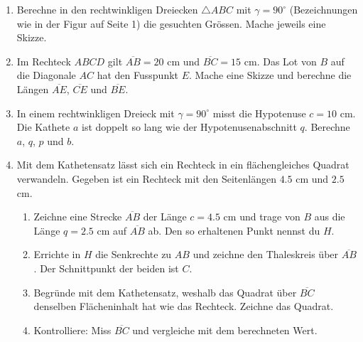 \documentclass[11pt,oneside]{article}
\begin{document}
	\begin{aufgabe}
		\begin{enumerate}
			\item Berechne in den rechtwinkligen Dreiecken $\triangle ABC$ mit $\gamma=90^\circ$ (Bezeichnungen wie in der Figur auf Seite 1) die gesuchten Grössen. Mache jeweils eine Skizze.
			\item Im Rechteck $ABCD$ gilt $\overline{AB}=20$ cm und $\overline{BC}=15$ cm. Das Lot von $B$ auf die Diagonale $AC$ hat den Fusspunkt $E$. Mache eine Skizze und berechne die Längen $\overline{AE}$, $\overline{CE}$ und $\overline{BE}$.
			\item In einem rechtwinkligen Dreieck mit $\gamma=90^\circ$ misst die Hypotenuse $c=10$ cm. Die Kathete $a$ ist doppelt so lang wie der Hypotenusenabschnitt $q$. Berechne $a$, $q$, $p$ und $b$.
			\item Mit dem Kathetensatz lässt sich ein Rechteck in ein flächengleiches Quadrat verwandeln. Gegeben ist ein Rechteck mit den Seitenlängen $4.5$ cm und $2.5$ cm.
			\begin{enumerate}[label=\alph*)]
				\item Zeichne eine Strecke $\overline{AB}$ der Länge $c=4.5$ cm und trage von $B$ aus die Länge $q=2.5$ cm auf $\overline{AB}$ ab. Den so erhaltenen Punkt nennst du $H$.
				\item Errichte in $H$ die Senkrechte zu $AB$ und zeichne den Thaleskreis über $\overline{AB}$. Der Schnittpunkt der beiden ist $C$.
				\item Begründe mit dem Kathetensatz, weshalb das Quadrat über $\overline{BC}$ denselben Flächeninhalt hat wie das Rechteck. Zeichne das Quadrat.
				\item Kontrolliere: Miss $\overline{BC}$ und vergleiche mit dem berechneten Wert.
			\end{enumerate}
		\end{enumerate}
	\end{aufgabe}
\end{document}
